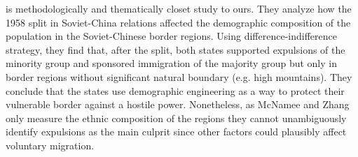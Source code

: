 \citet{mcnamee_demographic_2019} is methodologically and thematically closet study to ours. They analyze how the 1958 split in Soviet-China relations affected the demographic composition of the population in the Soviet-Chinese border regions.
Using difference-indifference strategy, they find that, after the split,  both states supported expulsions  of the minority group and sponsored immigration of the majority group but only in border regions without significant natural boundary (e.g. high mountains). They conclude that the states use demographic engineering as a way to protect their vulnerable border against a hostile power. Nonetheless, as McNamee and Zhang only measure the ethnic composition of the regions they cannot unambiguously identify expulsions as the main culprit since other factors could plausibly affect voluntary migration. %



